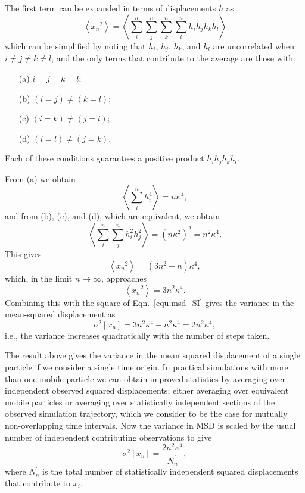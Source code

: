 \documentclass[reprint,superscriptaddress,nobibnotes,amsmath,amssymb,aps,prx,hidelinks]{revtex4-2}
\newcommand{\oMSDi}{\ensuremath{x_i}}
\newcommand{\oMSDn}{\ensuremath{x_n}}
\newcommand{\nind}[1]{\ensuremath{N^\prime_{#1}}}
\newcommand{\var}[1]{\ensuremath{\sigma^2[#1]}}
\begin{document}
The first term can be expanded in terms of displacements $h$ as
%
\begin{equation}
  \left<\oMSDn^2\right> = \left<\sum_i^n\sum_j^n\sum_k^n\sum_l^n h_i h_j h_k h_l\right>
  \label{equ:big_av}
\end{equation}
%
which can be simplified by noting that $h_i$, $h_j$, $h_k$, and $h_l$ are uncorrelated when $i \neq j \neq k \neq l$, and the only terms that contribute to the average are those with:
%
\begin{itemize}
    \item[(a)] $i = j = k = l$;
    \item[(b)] $(i = j) \neq (k = l)$;
    \item[(c)] $(i = k) \neq (j = l)$;
    \item[(d)] $(i = l) \neq (j = k)$. 
\end{itemize}
%
Each of these conditions guarantees a positive product $h_ih_jh_kh_l$.

From (a) we obtain
%
\begin{equation}
    \left<\sum_i^nh_i^4\right> = n\kappa^4,
\end{equation}
%
and from (b), (c), and (d), which are equivalent, we obtain
%
\begin{equation}
    \left<\sum_i^n\sum_j^nh_i^2h_j^2\right> = (n\kappa^2)^2 = n^2\kappa^4.
\end{equation}
%
This gives
%
\begin{equation}
    \left<\oMSDn^2\right> = (3n^2 + n)\kappa^4,
\end{equation}
%
which, in the limit $n \to \infty$, approaches
%
\begin{equation}
    \left<\oMSDn^2\right> = 3n^2\kappa^4.
    \label{equ:infty}
\end{equation}
%
Combining this with the square of Eqn.~\ref{equ:msd_SI} gives the variance in the mean-squared displacement as
%
\begin{equation}
    \var{\oMSDn} = 3n^2\kappa^4 - n^2\kappa^4 = 2n^2\kappa^4,
\end{equation}
%
i.e., the variance increases quadratically with the number of steps taken.

The result above gives the variance in the mean squared displacement of a single particle if we consider a single time origin.
In practical simulations with more than one mobile particle we can obtain improved statistics by averaging over independent observed squared displacements; either averaging over equivalent mobile particles or averaging over statistically independent sections of the observed simulation trajectory, which we consider to be the case for mutually non-overlapping time intervals.
Now the variance in MSD is scaled by the usual number of independent contributing observations to give
%
\begin{equation}
    \var{\oMSDn} = \frac{2n^2\kappa^4}{\nind{n}},
\label{equ:der_var}
\end{equation}
%
where $\nind{n}$ is the total number of statistically independent squared displacements that contribute to $\oMSDi$.
\end{document}
